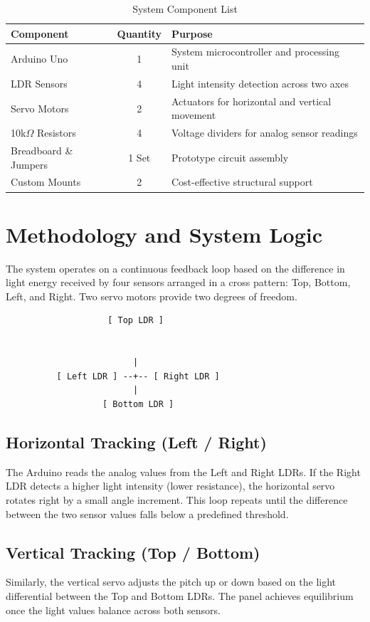 \documentclass[11pt,a4paper]{article}
\begin{document}
\begin{table}[h!]
\centering
\caption{System Component List}
\label{tab:materials}
\begin{tabular}{lcl}
\toprule
\textbf{Component} & \textbf{Quantity} & \textbf{Purpose} \\
\midrule
Arduino Uno & 1 & System microcontroller and processing unit \\
LDR Sensors & 4 & Light intensity detection across two axes \\
Servo Motors & 2 & Actuators for horizontal and vertical movement \\
10k$\Omega$ Resistors & 4 & Voltage dividers for analog sensor readings \\
Breadboard \& Jumpers & 1 Set & Prototype circuit assembly \\
Custom Mounts & 2 & Cost-effective structural support \\
\bottomrule
\end{tabular}
\end{table}

\section{Methodology and System Logic}
The system operates on a continuous feedback loop based on the difference in light energy received by four sensors arranged in a cross pattern: Top, Bottom, Left, and Right. Two servo motors provide two degrees of freedom.

\begin{verbatim}
                    [ Top LDR ]


                         |
          [ Left LDR ] --+-- [ Right LDR ]
                         |
                   [ Bottom LDR ]
\end{verbatim}

\subsection{Horizontal Tracking (Left / Right)}
The Arduino reads the analog values from the Left and Right LDRs. If the Right LDR detects a higher light intensity (lower resistance), the horizontal servo rotates right by a small angle increment. This loop repeats until the difference between the two sensor values falls below a predefined threshold.

\subsection{Vertical Tracking (Top / Bottom)}
Similarly, the vertical servo adjusts the pitch up or down based on the light differential between the Top and Bottom LDRs. The panel achieves equilibrium once the light values balance across both sensors.
\end{document}
